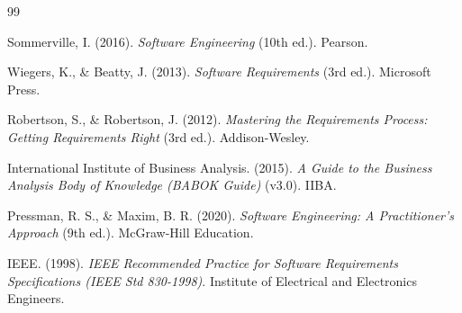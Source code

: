 \documentclass[11pt,a4paper]{article}
\begin{document}
\begin{thebibliography}{99}

	Sommerville, I. (2016).
	\textit{Software Engineering} (10th ed.).
	Pearson.

	Wiegers, K., \& Beatty, J. (2013).
	\textit{Software Requirements} (3rd ed.).
	Microsoft Press.

	Robertson, S., \& Robertson, J. (2012).
	\textit{Mastering the Requirements Process: Getting Requirements Right} (3rd ed.).
	Addison-Wesley.

	International Institute of Business Analysis. (2015).
	\textit{A Guide to the Business Analysis Body of Knowledge (BABOK Guide)} (v3.0).
	IIBA.

	Pressman, R. S., \& Maxim, B. R. (2020).
	\textit{Software Engineering: A Practitioner's Approach} (9th ed.).
	McGraw-Hill Education.

	IEEE. (1998).
	\textit{IEEE Recommended Practice for Software Requirements Specifications (IEEE Std 830-1998)}.
	Institute of Electrical and Electronics Engineers.

\end{thebibliography}
\end{document}
